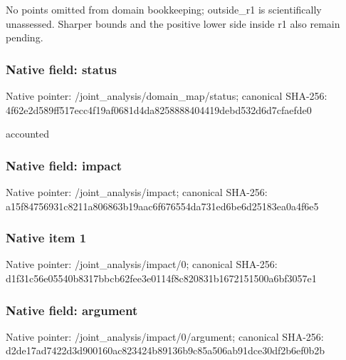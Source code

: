 \documentclass[10pt,a4paper]{article}
\begin{document}
\begingroup\raggedright\sloppy No points omitted from domain bookkeeping;\allowbreak{} outside\_\allowbreak{}r1 is scientifically unassessed. Sharper bounds and the positive lower side inside r1 also remain pending.\par\endgroup

\subsubsection{Native field: status}
Native pointer: /joint\_\allowbreak{}analysis/domain\_\allowbreak{}map/status; canonical SHA-256: 4f62e2d589ff517ecc4f19af0681d4da8258888404419debd532d6d7cfaefde0

\begingroup\raggedright\sloppy accounted\par\endgroup

\subsubsection{Native field: impact}
Native pointer: /joint\_\allowbreak{}analysis/impact; canonical SHA-256: a15f84756931c8211a806863b19aac6f676554da731ed6be6d25183ea0a4f6e5

\subsubsection{Native item 1}
Native pointer: /joint\_\allowbreak{}analysis/impact/0; canonical SHA-256: d1f31c56e05540b8317bbcb62fee3e0114f8c820831b1672151500a6bf3057e1

\subsubsection{Native field: argument}
Native pointer: /joint\_\allowbreak{}analysis/impact/0/argument; canonical SHA-256: d2de17ad7422d3d900160ac823424b89136b9c85a506ab91dce30df2b6ef0b2b
\end{document}
